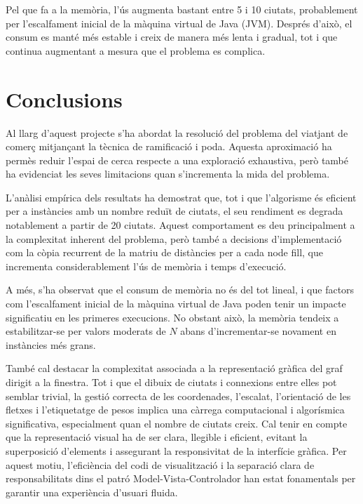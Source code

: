 \documentclass{ieeetj}
\begin{document}
Pel que fa a la memòria, l’ús augmenta bastant entre 5 i 10 ciutats, probablement per l’escalfament inicial de la màquina virtual de Java (JVM). Després d’això, el consum es manté més estable i creix de manera més lenta i gradual, tot i que continua augmentant a mesura que el problema es complica.



\section{Conclusions}

Al llarg d’aquest projecte s’ha abordat la resolució del problema del viatjant de comerç mitjançant la tècnica de ramificació i poda. Aquesta aproximació ha permès reduir l’espai de cerca respecte a una exploració exhaustiva, però també ha evidenciat les seves limitacions quan s’incrementa la mida del problema.

L’anàlisi empírica dels resultats ha demostrat que, tot i que l’algorisme és eficient per a instàncies amb un nombre reduït de ciutats, el seu rendiment es degrada notablement a partir de 20 ciutats. Aquest comportament es deu principalment a la complexitat inherent del problema, però també a decisions d’implementació com la còpia recurrent de la matriu de distàncies per a cada node fill, que incrementa considerablement l’ús de memòria i temps d’execució.

A més, s’ha observat que el consum de memòria no és del tot lineal, i que factors com l'escalfament inicial de la màquina virtual de Java poden tenir un impacte significatiu en les primeres execucions. No obstant això, la memòria tendeix a estabilitzar-se per valors moderats de $N$ abans d’incrementar-se novament en instàncies més grans.

També cal destacar la complexitat associada a la representació gràfica del graf dirigit a la finestra. Tot i que el dibuix de ciutats i connexions entre elles pot semblar trivial, la gestió correcta de les coordenades, l’escalat, l’orientació de les fletxes i l’etiquetatge de pesos implica una càrrega computacional i algorísmica significativa, especialment quan el nombre de ciutats creix. Cal tenir en compte que la representació visual ha de ser clara, llegible i eficient, evitant la superposició d’elements i assegurant la responsivitat de la interfície gràfica. Per aquest motiu, l’eficiència del codi de visualització i la separació clara de responsabilitats dins el patró Model-Vista-Controlador han estat fonamentals per garantir una experiència d’usuari fluida.
\end{document}
